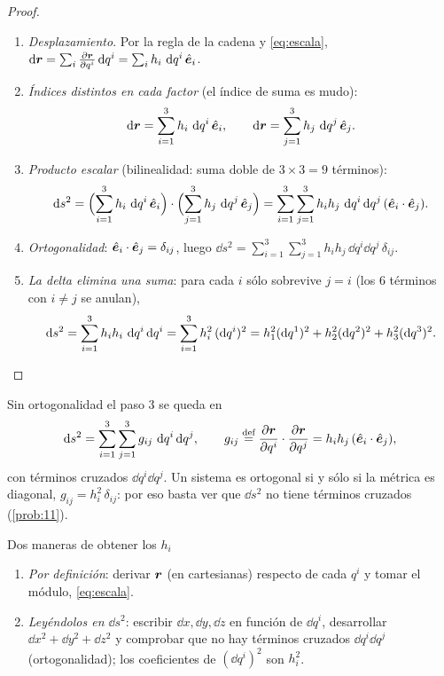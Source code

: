 \begin{proof}
\begin{enumerate}
  \item \emph{Desplazamiento}. Por la regla de la cadena y \eqref{eq:escala},
  $\mathop{}\!\mathrm{d}\bm{r}=\sum_{i}\frac{\partial \bm{r}}{\partial q^{i}}\mathop{}\!\mathrm{d} q^{i}=\sum_{i}h_{i}\,\mathop{}\!\mathrm{d} q^{i}\,\hat{\bm{e}}_{i}$.
  \item \emph{Índices distintos en cada factor} (el índice de suma es mudo):
  \[
    \mathop{}\!\mathrm{d}\bm{r}=\sum_{i=1}^{3}h_{i}\,\mathop{}\!\mathrm{d} q^{i}\,\hat{\bm{e}}_{i},\qquad
    \mathop{}\!\mathrm{d}\bm{r}=\sum_{j=1}^{3}h_{j}\,\mathop{}\!\mathrm{d} q^{j}\,\hat{\bm{e}}_{j}.
  \]
  \item \emph{Producto escalar} (bilinealidad: suma doble de $3\times3=9$ términos):
  \[
    \mathop{}\!\mathrm{d} s^{2}=\Bigl(\sum_{i=1}^{3}h_{i}\,\mathop{}\!\mathrm{d} q^{i}\,\hat{\bm{e}}_{i}\Bigr)\cdot\Bigl(\sum_{j=1}^{3}h_{j}\,\mathop{}\!\mathrm{d} q^{j}\,\hat{\bm{e}}_{j}\Bigr)
    =\sum_{i=1}^{3}\sum_{j=1}^{3}h_{i}h_{j}\,\mathop{}\!\mathrm{d} q^{i}\mathop{}\!\mathrm{d} q^{j}\,(\hat{\bm{e}}_{i}\cdot\hat{\bm{e}}_{j}).
  \]
  \item \emph{Ortogonalidad}: $\hat{\bm{e}}_{i}\cdot\hat{\bm{e}}_{j}=\delta_{ij}$, luego
  $\dd s^{2}=\sum_{i=1}^{3}\sum_{j=1}^{3}h_{i}h_{j}\,\dd q^{i}\dd q^{j}\,\delta_{ij}$.
  \item \emph{La delta elimina una suma}: para cada $i$ sólo sobrevive $j=i$
  (los 6 términos con $i\neq j$ se anulan),
  \[
    \mathop{}\!\mathrm{d} s^{2}=\sum_{i=1}^{3}h_{i}h_{i}\,\mathop{}\!\mathrm{d} q^{i}\mathop{}\!\mathrm{d} q^{i}=\sum_{i=1}^{3}h_{i}^{2}\,(\mathop{}\!\mathrm{d} q^{i})^{2}
    =h_{1}^{2}(\mathop{}\!\mathrm{d} q^{1})^{2}+h_{2}^{2}(\mathop{}\!\mathrm{d} q^{2})^{2}+h_{3}^{2}(\mathop{}\!\mathrm{d} q^{3})^{2}.\qedhere
  \]
\end{enumerate}
\end{proof}

\begin{observacion}
Sin ortogonalidad el paso 3 se queda en
\[
  \mathop{}\!\mathrm{d} s^{2}=\sum_{i=1}^{3}\sum_{j=1}^{3}g_{ij}\,\mathop{}\!\mathrm{d} q^{i}\mathop{}\!\mathrm{d} q^{j},\qquad
  g_{ij}\stackrel{\text{def}}{=}\frac{\partial \bm{r}}{\partial q^{i}}\cdot\frac{\partial \bm{r}}{\partial q^{j}}=h_{i}h_{j}\,(\hat{\bm{e}}_{i}\cdot\hat{\bm{e}}_{j}),
\]
con términos cruzados $\dd q^{i}\dd q^{j}$. Un sistema es ortogonal si y sólo
si la métrica es diagonal, $g_{ij}=h_{i}^{2}\,\delta_{ij}$: por eso basta ver
que $\dd s^{2}$ no tiene términos cruzados (\cref{prob:11}).
\end{observacion}

\begin{clave}{Dos maneras de obtener los $h_{i}$}
\begin{enumerate}[leftmargin=1.4em]
  \item \emph{Por definición}: derivar $\bm{r}$ (en cartesianas) respecto de
        cada $q^{i}$ y tomar el módulo, \eqref{eq:escala}.
  \item \emph{Leyéndolos en $\dd s^{2}$}: escribir $\dd x,\dd y,\dd z$ en
        función de $\dd q^{i}$, desarrollar $\dd x^{2}+\dd y^{2}+\dd z^{2}$ y
        comprobar que no hay términos cruzados $\dd q^{i}\dd q^{j}$ (ortogonalidad);
        los coeficientes de $(\dd q^{i})^{2}$ son $h_{i}^{2}$.
\end{enumerate}
\end{clave}

